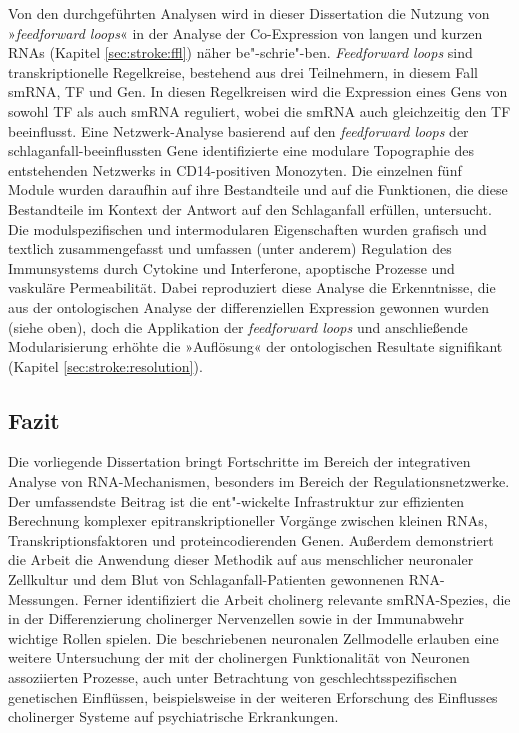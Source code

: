 Von den durchgeführten Analysen wird in dieser Dissertation die Nutzung von »\emph{feedforward loops}« in der Analyse der Co-Expression von langen und kurzen RNAs (Kapitel \ref{sec:stroke:ffl}) näher be"-schrie"-ben. \emph{Feedforward loops} sind transkriptionelle Regelkreise, bestehend aus drei Teilnehmern, in diesem Fall smRNA, TF und Gen. In diesen Regelkreisen wird die Expression eines Gens von sowohl TF als auch smRNA reguliert, wobei die smRNA auch gleichzeitig den TF beeinflusst. Eine Netzwerk-Analyse basierend auf den \emph{feedforward loops} der schlaganfall-beeinflussten Gene identifizierte eine modulare Topographie des entstehenden Netzwerks in CD14-positiven Monozyten. Die einzelnen fünf Module wurden daraufhin auf ihre Bestandteile und auf die Funktionen, die diese Bestandteile im Kontext der Antwort auf den Schlaganfall erfüllen, untersucht. Die modulspezifischen und intermodularen Eigenschaften wurden grafisch und textlich zusammengefasst und umfassen (unter anderem) Regulation des Immunsystems durch Cytokine und Interferone, apoptische Prozesse und vaskuläre Permeabilität. Dabei reproduziert diese Analyse die Erkenntnisse, die aus der ontologischen Analyse der differenziellen Expression gewonnen wurden (siehe oben), doch die Applikation der \emph{feedforward loops} und anschließende Modularisierung erhöhte die »Auflösung« der ontologischen Resultate signifikant (Kapitel \ref{sec:stroke:resolution}).

\subsection{Fazit}
Die vorliegende Dissertation bringt Fortschritte im Bereich der integrativen Analyse von RNA-Mechanismen, besonders im Bereich der Regulationsnetzwerke. Der umfassendste Beitrag ist die ent"-wickelte Infrastruktur zur effizienten Berechnung komplexer epitranskriptioneller Vorgänge zwischen kleinen RNAs, Transkriptionsfaktoren und proteincodierenden Genen. Außerdem demonstriert die Arbeit die Anwendung dieser Methodik auf aus menschlicher neuronaler Zellkultur und dem Blut von Schlaganfall-Patienten gewonnenen RNA-Messungen. Ferner identifiziert die Arbeit cholinerg relevante smRNA-Spezies, die in der Differenzierung cholinerger Nervenzellen sowie in der Immunabwehr wichtige Rollen spielen. Die beschriebenen neuronalen Zellmodelle erlauben eine weitere Untersuchung der mit der cholinergen Funktionalität von Neuronen assoziierten Prozesse, auch unter Betrachtung von geschlechtsspezifischen genetischen Einflüssen, beispielsweise in der weiteren Erforschung des Einflusses cholinerger Systeme auf psychiatrische Erkrankungen.

